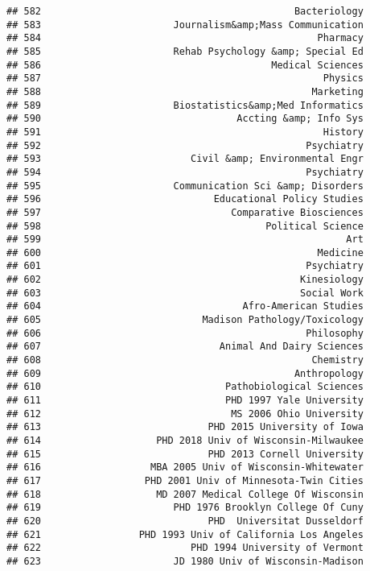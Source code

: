 \documentclass[
]{article}
\begin{document}
\begin{verbatim}
## 582                                            Bacteriology
## 583                       Journalism&amp;Mass Communication
## 584                                                Pharmacy
## 585                       Rehab Psychology &amp; Special Ed
## 586                                        Medical Sciences
## 587                                                 Physics
## 588                                               Marketing
## 589                       Biostatistics&amp;Med Informatics
## 590                                  Accting &amp; Info Sys
## 591                                                 History
## 592                                              Psychiatry
## 593                          Civil &amp; Environmental Engr
## 594                                              Psychiatry
## 595                       Communication Sci &amp; Disorders
## 596                              Educational Policy Studies
## 597                                 Comparative Biosciences
## 598                                       Political Science
## 599                                                     Art
## 600                                                Medicine
## 601                                              Psychiatry
## 602                                             Kinesiology
## 603                                             Social Work
## 604                                   Afro-American Studies
## 605                            Madison Pathology/Toxicology
## 606                                              Philosophy
## 607                               Animal And Dairy Sciences
## 608                                               Chemistry
## 609                                            Anthropology
## 610                                Pathobiological Sciences
## 611                                PHD 1997 Yale University
## 612                                 MS 2006 Ohio University
## 613                             PHD 2015 University of Iowa
## 614                    PHD 2018 Univ of Wisconsin-Milwaukee
## 615                             PHD 2013 Cornell University
## 616                   MBA 2005 Univ of Wisconsin-Whitewater
## 617                  PHD 2001 Univ of Minnesota-Twin Cities
## 618                    MD 2007 Medical College Of Wisconsin
## 619                       PHD 1976 Brooklyn College Of Cuny
## 620                             PHD  Universitat Dusseldorf
## 621                 PHD 1993 Univ of California Los Angeles
## 622                          PHD 1994 University of Vermont
## 623                       JD 1980 Univ of Wisconsin-Madison

\end{verbatim}
\end{document}
